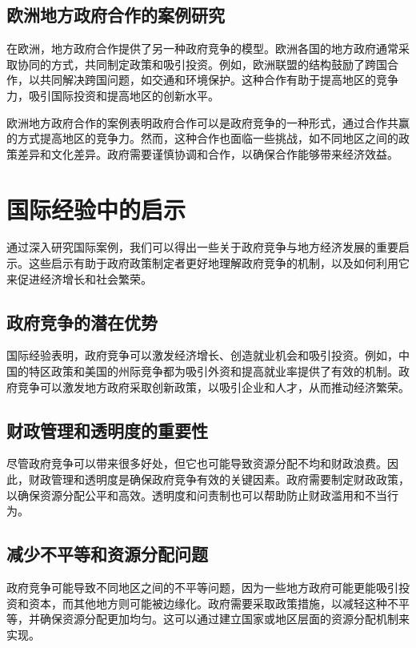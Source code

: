 \documentclass[a4paper,12pt]{ctexart}
\begin{document}
\subsection{欧洲地方政府合作的案例研究}

在欧洲，地方政府合作提供了另一种政府竞争的模型。欧洲各国的地方政府通常采取协同的方式，共同制定政策和吸引投资。例如，欧洲联盟的结构鼓励了跨国合作，以共同解决跨国问题，如交通和环境保护。这种合作有助于提高地区的竞争力，吸引国际投资和提高地区的创新水平。

欧洲地方政府合作的案例表明政府合作可以是政府竞争的一种形式，通过合作共赢的方式提高地区的竞争力。然而，这种合作也面临一些挑战，如不同地区之间的政策差异和文化差异。政府需要谨慎协调和合作，以确保合作能够带来经济效益。


\section{国际经验中的启示}

通过深入研究国际案例，我们可以得出一些关于政府竞争与地方经济发展的重要启示。这些启示有助于政府政策制定者更好地理解政府竞争的机制，以及如何利用它来促进经济增长和社会繁荣。

\subsection{政府竞争的潜在优势}

国际经验表明，政府竞争可以激发经济增长、创造就业机会和吸引投资\citep{曹文超2019地方政府竞争与区域经济协调发展}。例如，中国的特区政策和美国的州际竞争都为吸引外资和提高就业率提供了有效的机制。政府竞争可以激发地方政府采取创新政策，以吸引企业和人才，从而推动经济繁荣。

\subsection{财政管理和透明度的重要性}

尽管政府竞争可以带来很多好处，但它也可能导致资源分配不均和财政浪费。因此，财政管理和透明度是确保政府竞争有效的关键因素。政府需要制定财政政策，以确保资源分配公平和高效。透明度和问责制也可以帮助防止财政滥用和不当行为。

\subsection{减少不平等和资源分配问题}

政府竞争可能导致不同地区之间的不平等问题，因为一些地方政府可能更能吸引投资和资本，而其他地方则可能被边缘化。政府需要采取政策措施，以减轻这种不平等，并确保资源分配更加均匀。这可以通过建立国家或地区层面的资源分配机制来实现。
\end{document}
